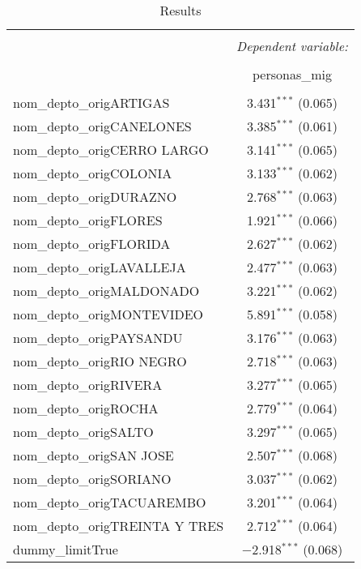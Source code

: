 
\begin{table}[!htbp] \centering 
  \caption{Results} 
  \label{} 
\begin{tabular}{@{\extracolsep{5pt}}lc} 
\\[-1.8ex]\hline 
\hline \\[-1.8ex] 
 & \multicolumn{1}{c}{\textit{Dependent variable:}} \\ 
\cline{2-2} 
\\[-1.8ex] & personas\_mig \\ 
\hline \\[-1.8ex] 
 nom\_depto\_origARTIGAS & 3.431$^{***}$ (0.065) \\ 
  nom\_depto\_origCANELONES & 3.385$^{***}$ (0.061) \\ 
  nom\_depto\_origCERRO LARGO & 3.141$^{***}$ (0.065) \\ 
  nom\_depto\_origCOLONIA & 3.133$^{***}$ (0.062) \\ 
  nom\_depto\_origDURAZNO & 2.768$^{***}$ (0.063) \\ 
  nom\_depto\_origFLORES & 1.921$^{***}$ (0.066) \\ 
  nom\_depto\_origFLORIDA & 2.627$^{***}$ (0.062) \\ 
  nom\_depto\_origLAVALLEJA & 2.477$^{***}$ (0.063) \\ 
  nom\_depto\_origMALDONADO & 3.221$^{***}$ (0.062) \\ 
  nom\_depto\_origMONTEVIDEO & 5.891$^{***}$ (0.058) \\ 
  nom\_depto\_origPAYSANDU & 3.176$^{***}$ (0.063) \\ 
  nom\_depto\_origRIO NEGRO & 2.718$^{***}$ (0.063) \\ 
  nom\_depto\_origRIVERA & 3.277$^{***}$ (0.065) \\ 
  nom\_depto\_origROCHA & 2.779$^{***}$ (0.064) \\ 
  nom\_depto\_origSALTO & 3.297$^{***}$ (0.065) \\ 
  nom\_depto\_origSAN JOSE & 2.507$^{***}$ (0.068) \\ 
  nom\_depto\_origSORIANO & 3.037$^{***}$ (0.062) \\ 
  nom\_depto\_origTACUAREMBO & 3.201$^{***}$ (0.064) \\ 
  nom\_depto\_origTREINTA Y TRES & 2.712$^{***}$ (0.064) \\ 
  dummy\_limitTrue & $-$2.918$^{***}$ (0.068) \\ 

\end{tabular}
\end{table}
